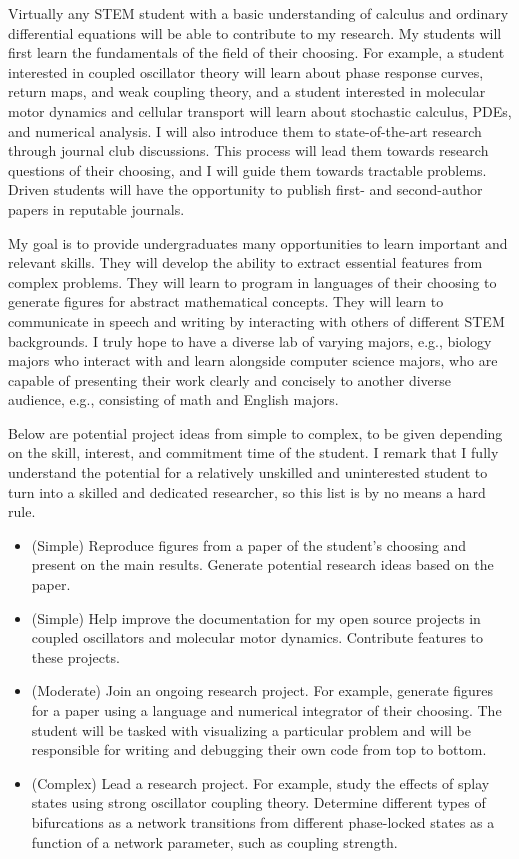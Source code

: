 \documentclass[a4paper,11pt]{article}
\begin{document}
Virtually any STEM student with a basic understanding of calculus and ordinary differential equations will be able to contribute to my research. My students will first learn the fundamentals of the field of their choosing. For example, a student interested in coupled oscillator theory will learn about phase response curves, return maps, and weak coupling theory, and a student interested in molecular motor dynamics and cellular transport will learn about stochastic calculus, PDEs, and numerical analysis. I will also introduce them to state-of-the-art research through journal club discussions. This process will lead them towards research questions of their choosing, and I will guide them towards tractable problems. Driven students will have the opportunity to publish first- and second-author papers in reputable journals.

My goal is to provide undergraduates many opportunities to learn important and relevant skills. They will develop the ability to extract essential features from complex problems. They will learn to program in languages of their choosing to generate figures for abstract mathematical concepts. They will learn to communicate in speech and writing by interacting with others of different STEM backgrounds. I truly hope to have a diverse lab of varying majors, e.g., biology majors who interact with and learn alongside computer science majors, who are capable of presenting their work clearly and concisely to another diverse audience, e.g., consisting of math and English majors.

Below are potential project ideas from simple to complex, to be given depending on the skill, interest, and commitment time of the student. I remark that I fully understand the potential for a relatively unskilled and uninterested student to turn into a skilled and dedicated researcher, so this list is by no means a hard rule.

\begin{itemize}
	\item (Simple) Reproduce figures from a paper of the student's choosing and present on the main results. Generate potential research ideas based on the paper.
	\item (Simple) Help improve the documentation for my open source projects in coupled oscillators and molecular motor dynamics. Contribute features to these projects.
	\item (Moderate) Join an ongoing research project. For example, generate figures for a paper using a language and numerical integrator of their choosing. The student will be tasked with visualizing a particular problem and will be responsible for writing and debugging their own code from top to bottom.
	\item (Complex) Lead a research project. For example, study the effects of splay states using strong oscillator coupling theory. Determine different types of bifurcations as a network transitions from different phase-locked states as a function of a network parameter, such as coupling strength.
\end{itemize}
\end{document}
